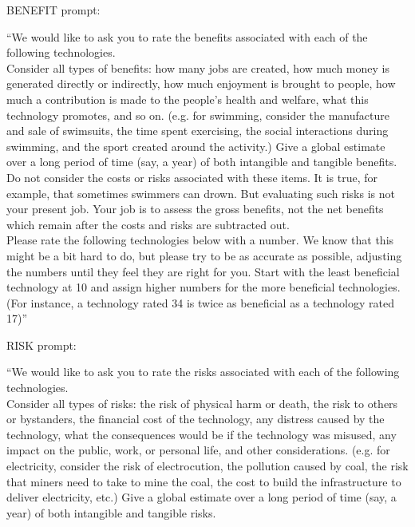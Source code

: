 \documentclass{acm_proc_article-sp}
\begin{document}
BENEFIT prompt: 


``We would like to ask you to rate the benefits associated with each of the following technologies.  \\[-.6cm]

Consider all types of benefits: how many jobs are created, how much money is generated directly or indirectly, how much enjoyment is brought to people, how much a contribution is made to the people's health and welfare, what this technology promotes, and so on. (e.g. for swimming, consider the manufacture and sale of swimsuits, the time spent exercising, the social interactions during swimming, and the sport created around the activity.) Give a global estimate over a long period of time (say, a year) of both intangible and tangible benefits. \\[-.6cm]

Do not consider the costs or risks associated with these items. It is true, for example, that sometimes swimmers can drown. But evaluating such risks is not your present job. Your job is to assess the gross benefits, not the net benefits which remain after the costs and risks are subtracted out. \\[-.6cm]

Please rate the following technologies below with a number. We know that this might be a bit hard to do, but please try to be as accurate as possible, adjusting the numbers until they feel they are right for you. Start with the least beneficial technology at 10 and assign higher numbers for the more beneficial technologies. (For instance, a technology rated 34 is twice as beneficial as a technology rated 17)''

RISK prompt:

``We would like to ask you to rate the risks associated with each of the following technologies. \\[-.6cm]

Consider all types of risks: the risk of physical harm or death, the risk to others or bystanders, the financial cost of the technology, any distress caused by the technology, what the consequences would be if the technology was misused, any impact on the public, work, or personal life, and other considerations. (e.g. for electricity, consider the risk of electrocution, the pollution caused by coal, the risk that miners need to take to mine the coal, the cost to build the infrastructure to deliver electricity, etc.) Give a global estimate over a long period of time (say, a year) of both intangible and tangible risks. \\[-.6cm]
\end{document}
